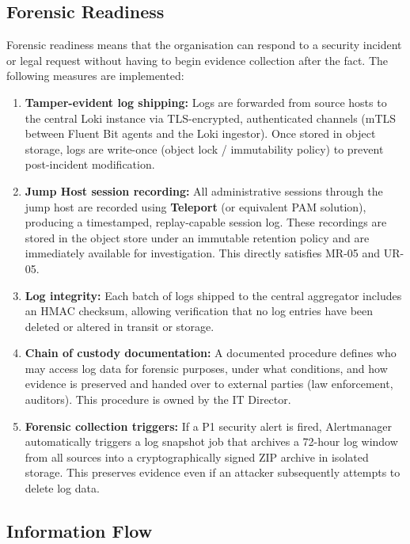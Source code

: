 \subsection{Forensic Readiness}

Forensic readiness means that the organisation can respond to a security incident or legal request without having to begin evidence collection after the fact. The following measures are implemented:

\begin{enumerate}
    \item \textbf{Tamper-evident log shipping:} Logs are forwarded from source hosts to the central Loki instance via TLS-encrypted, authenticated channels (mTLS between Fluent Bit agents and the Loki ingestor). Once stored in object storage, logs are write-once (object lock / immutability policy) to prevent post-incident modification.

    \item \textbf{Jump Host session recording:} All administrative sessions through the jump host are recorded using \textbf{Teleport} (or equivalent PAM solution), producing a timestamped, replay-capable session log. These recordings are stored in the object store under an immutable retention policy and are immediately available for investigation. This directly satisfies MR-05 and UR-05.

    \item \textbf{Log integrity:} Each batch of logs shipped to the central aggregator includes an HMAC checksum, allowing verification that no log entries have been deleted or altered in transit or storage.

    \item \textbf{Chain of custody documentation:} A documented procedure defines who may access log data for forensic purposes, under what conditions, and how evidence is preserved and handed over to external parties (law enforcement, auditors). This procedure is owned by the IT Director.

    \item \textbf{Forensic collection triggers:} If a P1 security alert is fired, Alertmanager automatically triggers a log snapshot job that archives a 72-hour log window from all sources into a cryptographically signed ZIP archive in isolated storage. This preserves evidence even if an attacker subsequently attempts to delete log data.
\end{enumerate}

\subsection{Information Flow}

